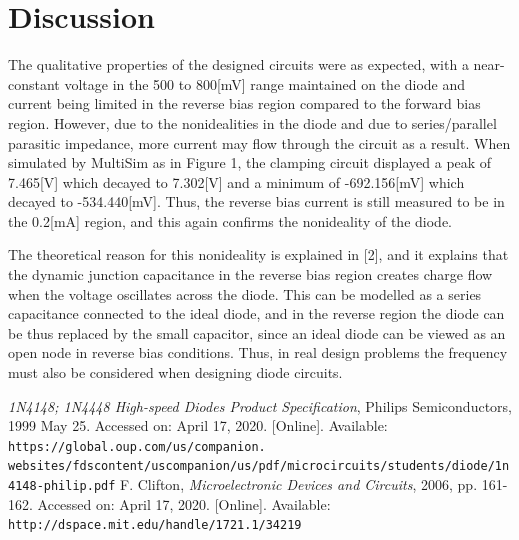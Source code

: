 \documentclass[a4paper, itemph]{oblivoir}
\theoremstyle{definition}
\begin{document}
\section{Discussion}
The qualitative properties of the designed circuits were as expected, with a near-constant voltage in the 500 to 800[mV] range maintained on the diode and current being limited in the reverse bias region compared to the forward bias region. However, due to the nonidealities in the diode and due to series/parallel parasitic impedance, more current may flow through the circuit as a result. When simulated by MultiSim as in Figure 1, the clamping circuit displayed a peak of 7.465[V] which decayed to 7.302[V] and a minimum of -692.156[mV] which decayed to -534.440[mV]. Thus, the reverse bias current is still measured to be in the 0.2[mA] region, and this again confirms the nonideality of the diode.

The theoretical reason for this nonideality is explained in [2], and it explains that the dynamic junction capacitance in the reverse bias region creates charge flow when the voltage oscillates across the diode. This can be modelled as a series capacitance connected to the ideal diode, and in the reverse region the diode can be thus replaced by the small capacitor, since an ideal diode can be viewed as an open node in reverse bias conditions. Thus, in real design problems the frequency must also be considered when designing diode circuits.

\begin{thebibliography}{}

 \textit{1N4148; 1N4448
High-speed Diodes Product Specification}, Philips Semiconductors, 1999 May 25. Accessed on: April 17, 2020. [Online]. Available: \texttt{https://global.oup.com/us/companion.\\websites/fdscontent/uscompanion/us/pdf/microcircuits/students/diode/1n4148-philip.pdf}
 F. Clifton, \textit{Microelectronic Devices and Circuits}, 2006, pp. 161-162. Accessed on: April 17, 2020. [Online]. Available: \texttt{http://dspace.mit.edu/handle/1721.1/34219}

\end{thebibliography}
\end{document}

